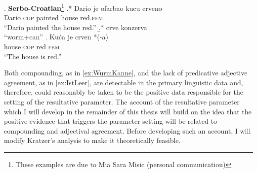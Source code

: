 \ex. \textbf{Serbo-Croatian}\footnote{These examples are due to Mia Sara Misic (personal communication)} 
\ag.* Dario je ofarbao kucu crveno\\
Dario \textsc{cop} painted house red.\textsc{fem}\\
``Dario painted the house red.''
\b.* crve konzerva\\
``worm+can''
\cg. Ku\'ca je crven *(-a)\\
house \textsc{cop} red \textsc{fem}\\
``The house is red.''

Both compounding, as in \cref{ex:WurmKanne}, and the lack of predicative adjective agreement, as in \cref{ex:IstLeer}, are detectable in the primary linguistic data and, therefore, could reasonably be taken to be the positive data responsible for the setting of the resultative parameter.
The account of the resultative parameter which I will develop in the remainder of this thesis will build on the idea that the positive evidence that triggers the parameter setting will be related to compounding and adjectival agreement.
Before developing such an account, I will modify Kratzer's analysis to make it theoretically feasible.
